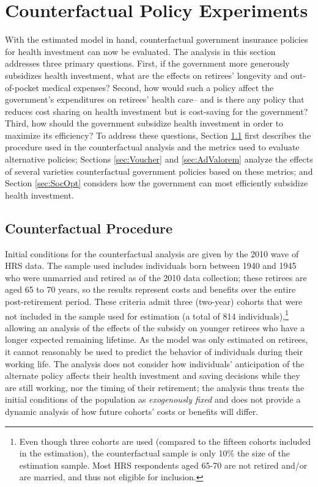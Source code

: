 \documentclass[12pt,pdftex,letterpaper]{article}
\begin{document}
\section{Counterfactual Policy Experiments}
\label{sec:Counterfactual}

With the estimated model in hand, counterfactual government insurance policies for health investment can now be evaluated.  The analysis in this section addresses three primary questions.  First, if the government more generously subsidizes health investment, what are the effects on retirees' longevity and out-of-pocket medical expenses?  Second, how would such a policy affect the government's expenditures on retirees' health care-- and is there any policy that reduces cost sharing on health investment but is cost-saving for the government?  Third, how should the government subsidize health investment in order to maximize its efficiency?  To address these questions, Section \ref{sec:CounterfactualProcedure} first describes the procedure used in the counterfactual analysis and the metrics used to evaluate alternative policies; Sections \ref{sec:Voucher} and \ref{sec:AdValorem} analyze the effects of several varieties counterfactual government policies based on these metrics; and Section \ref{sec:SocOpt} considers how the government can most efficiently subsidize health investment.

\subsection{Counterfactual Procedure}
\label{sec:CounterfactualProcedure}

Initial conditions for the counterfactual analysis are given by the 2010 wave of HRS data.  The sample used includes individuals born between 1940 and 1945 who were unmarried and retired as of the 2010 data collection; these retirees are aged 65 to 70 years, so the results represent costs and benefits over the entire post-retirement period.  These criteria admit three (two-year) cohorts that were not included in the sample used for estimation (a total of 814 individuals),\footnote{Even though three cohorts are used (compared to the fifteen cohorts included in the estimation), the counterfactual sample is only 10\% the size of the estimation sample. Most HRS respondents aged 65-70 are not retired and/or are married, and thus not eligible for inclusion.} allowing an analysis of the effects of the subsidy on younger retirees who have a longer expected remaining lifetime. As the model was only estimated on retirees, it cannot reasonably be used to predict the behavior of individuals during their working life.  The analysis does not consider how individuals' anticipation of the alternate policy affects their health investment and saving decisions while they are still working, nor the timing of their retirement; the analysis thus treats the initial conditions of the population as \textit{exogenously fixed} and does not provide a dynamic analysis of how future cohorts' costs or benefits will differ.  
\end{document}
